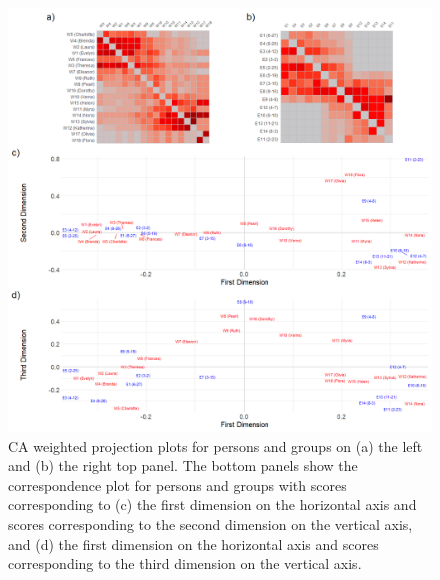 \documentclass[a4paper,fleqn]{cas-sc}
\begin{document}
\begin{figure}[ht!]
    \captionsetup[subfigure]{font=footnotesize,labelfont=footnotesize}
    \centering
        \includegraphics[width=1.0\textwidth]{Plots/ca-corr-plot.png}
    \caption{CA weighted projection plots for persons and groups on (a) the left and (b) the right top panel. The bottom panels show the correspondence plot for persons and groups with scores corresponding to (c) the first dimension on the horizontal axis and scores corresponding to the second dimension on the vertical axis, and (d) the first dimension on the horizontal axis and scores corresponding to the third dimension on the vertical axis.}
    \label{fig:ca}
\end{figure}
\end{document}
